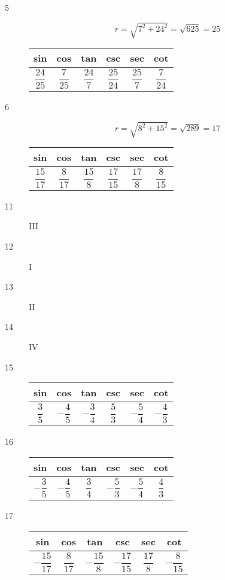 \documentclass[fleqn,addpoints]{exam}
\begin{document}
\begin{description}
\begin{description}
\end{description}

\item[5]
\[
  r = \sqrt{7^2 + 24^2} = \sqrt{625} = 25
\]

\begin{tabular}{cccccc}
\toprule
sin & cos & tan & csc & sec & cot \\
\midrule
  $\dfrac{24}{25}$ &  $\dfrac{7}{25}$ & $\dfrac{24}{7}$ & $\dfrac{25}{24}$ & $\dfrac{25}{7}$ & $\dfrac{7}{24}$ \\
\bottomrule
\end{tabular}

\item[6]
\[
  r = \sqrt{8^2 + 15^2} = \sqrt{289} = 17
\]

\begin{tabular}{cccccc}
\toprule
sin & cos & tan & csc & sec & cot \\
\midrule
  $\dfrac{15}{17}$ &  $\dfrac{8}{17}$ & $\dfrac{15}{8}$ & $\dfrac{17}{15}$ & $\dfrac{17}{8}$ & $\dfrac{8}{15}$ \\
\bottomrule
\end{tabular}

\item[11] III
\item[12] I
\item[13] II
\item[14] IV

\item[15]
\begin{tabular}{cccccc}
\toprule
sin & cos & tan & csc & sec & cot \\
\midrule
  $\dfrac{3}{5}$ &  $- \dfrac{4}{5}$ & $- \dfrac{3}{4}$ & $\dfrac{5}{3}$ & $-\dfrac{5}{4}$ & $- \dfrac{4}{3}$ \\
\bottomrule
\end{tabular}

\item[16]
\begin{tabular}{cccccc}
\toprule
sin & cos & tan & csc & sec & cot \\
\midrule
  $-\dfrac{3}{5}$ &  $- \dfrac{4}{5}$ & $\dfrac{3}{4}$ & $-\dfrac{5}{3}$ & $-\dfrac{5}{4}$ & $\dfrac{4}{3}$ \\
\bottomrule
\end{tabular}

\item[17]
\begin{tabular}{cccccc}
\toprule
sin & cos & tan & csc & sec & cot \\
\midrule
  $-\dfrac{15}{17}$ &  $\dfrac{8}{17}$ & $- \dfrac{15}{8}$ & $-\dfrac{17}{15}$ & $\dfrac{17}{8}$ & $-\dfrac{8}{15}$ \\
\bottomrule
\end{tabular}


\end{description}
\end{document}
